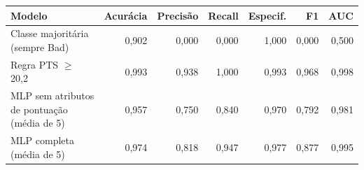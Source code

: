 \begin{tabular}{lrrrrrr}
\toprule
Modelo & Acurácia & Precisão & Recall & Especif. & F1 & AUC \\
\midrule
Classe majoritária (sempre Bad) & 0,902 & 0,000 & 0,000 & 1,000 & 0,000 & 0,500 \\
Regra PTS $\geq$ 20,2 & 0,993 & 0,938 & 1,000 & 0,993 & 0,968 & 0,998 \\
MLP sem atributos de pontuação (média de 5) & 0,957 & 0,750 & 0,840 & 0,970 & 0,792 & 0,981 \\
MLP completa (média de 5) & 0,974 & 0,818 & 0,947 & 0,977 & 0,877 & 0,995 \\
\bottomrule
\end{tabular}
